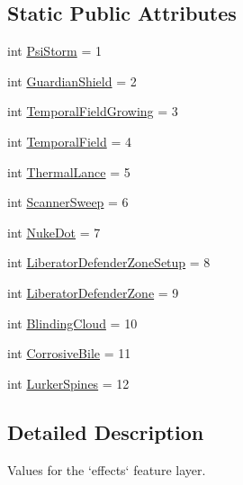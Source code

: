 \subsection*{Static Public Attributes}
\begin{DoxyCompactItemize}
\item 
int \mbox{\hyperlink{classpysc2_1_1lib_1_1features_1_1_effects_a13a840bd029e23e205a91edfafbaa8c3}{Psi\+Storm}} = 1
\item 
int \mbox{\hyperlink{classpysc2_1_1lib_1_1features_1_1_effects_ab74615673cebae9903287968e0b949f0}{Guardian\+Shield}} = 2
\item 
int \mbox{\hyperlink{classpysc2_1_1lib_1_1features_1_1_effects_a48a90cc392c74c0c17c91229a0d8d1c4}{Temporal\+Field\+Growing}} = 3
\item 
int \mbox{\hyperlink{classpysc2_1_1lib_1_1features_1_1_effects_aed31efb4698e8fd3c26a6cfe183c590f}{Temporal\+Field}} = 4
\item 
int \mbox{\hyperlink{classpysc2_1_1lib_1_1features_1_1_effects_a19f880ae3f13c285675db46675e86db6}{Thermal\+Lance}} = 5
\item 
int \mbox{\hyperlink{classpysc2_1_1lib_1_1features_1_1_effects_a537c89bacceab397addc4d7cabf56042}{Scanner\+Sweep}} = 6
\item 
int \mbox{\hyperlink{classpysc2_1_1lib_1_1features_1_1_effects_ae61b599ec15cf0cac0dfa54e7e5ffb40}{Nuke\+Dot}} = 7
\item 
int \mbox{\hyperlink{classpysc2_1_1lib_1_1features_1_1_effects_af0e07c05976e507275f651a7e1ca6017}{Liberator\+Defender\+Zone\+Setup}} = 8
\item 
int \mbox{\hyperlink{classpysc2_1_1lib_1_1features_1_1_effects_af0c1ed1fdfea242888e216419ca05c10}{Liberator\+Defender\+Zone}} = 9
\item 
int \mbox{\hyperlink{classpysc2_1_1lib_1_1features_1_1_effects_aef0d51c221a9c1b80d6e7f3c11986b9d}{Blinding\+Cloud}} = 10
\item 
int \mbox{\hyperlink{classpysc2_1_1lib_1_1features_1_1_effects_acfd91c4b7c29f824809dbc39f0a71e04}{Corrosive\+Bile}} = 11
\item 
int \mbox{\hyperlink{classpysc2_1_1lib_1_1features_1_1_effects_a9be68980993549c17e5cb108a1c75af8}{Lurker\+Spines}} = 12
\end{DoxyCompactItemize}


\subsection{Detailed Description}
\begin{DoxyVerb}Values for the `effects` feature layer.\end{DoxyVerb}
 

